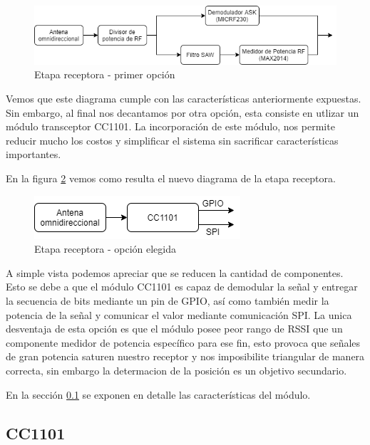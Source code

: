 \begin{figure}[htb]
	\centering
	\includegraphics[scale=0.6]{images/Opcion1.png}
    \caption{Etapa receptora - primer opción}
	\label{EtapaReceptora1}
\end{figure}


Vemos que este diagrama cumple con las características anteriormente expuestas. Sin embargo, al final nos decantamos por otra opción, 
esta consiste en utlizar un módulo transceptor CC1101. La incorporación de este módulo, nos permite reducir mucho los costos y simplificar
el sistema sin sacrificar características importantes. \par
En la figura \ref{EtapaReceptora2} vemos como resulta el nuevo diagrama de la etapa receptora. \par

\begin{figure}[htb]
	\centering
	\includegraphics[scale=0.6]{images/Opcion2.png}
    \caption{Etapa receptora - opción elegida}
	\label{EtapaReceptora2}
\end{figure}

A simple vista podemos apreciar que se reducen la cantidad de componentes. Esto se debe a que el módulo CC1101 es capaz de demodular la señal y
entregar la secuencia de bits mediante un pin de GPIO, así como también medir la potencia de la señal y comunicar el valor mediante comunicación SPI.
La unica desventaja de esta opción es que el módulo posee peor rango de RSSI que un componente medidor de potencia específico para ese fin,
esto provoca que señales de gran potencia saturen nuestro receptor y nos imposibilite triangular de manera correcta, sin embargo la determacion 
de la posición es un objetivo secundario. \par
En la sección \ref{cap:cc1101} se exponen en detalle las características del módulo.\par

\subsection{CC1101} \label{cap:cc1101}
